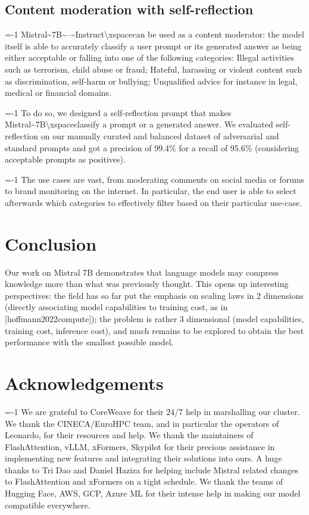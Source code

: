 \documentclass[11pt,a4paper]{article}
\begin{document}
\subsection{Content moderation with self-reflection}

=-1 Mistral\textasciitilde{}7B\textasciitilde{}--\textasciitilde{}Instruct\textbackslash{}xspacecan be used as a content moderator: the model itself is able to accurately classify a user prompt or its generated answer as being either acceptable or falling into one of the following categories: Illegal activities such as terrorism, child abuse or fraud; Hateful, harassing or violent content such as discrimination, self-harm or bullying; Unqualified advice for instance in legal, medical or financial domains.

=-1 To do so, we designed a self-reflection prompt that makes Mistral\textasciitilde{}7B\textbackslash{}xspaceclassify a prompt or a generated answer. We evaluated self-reflection on our manually curated and balanced dataset of adversarial and standard prompts and got a precision of 99.4\% for a recall of 95.6\% (considering acceptable prompts as positives).

=-1 The use cases are vast, from moderating comments on social media or forums to brand monitoring on the internet. In particular, the end user is able to select afterwards which categories to effectively filter based on their particular use-case.

\section{Conclusion}

Our work on Mistral 7B demonstrates that language models may compress knowledge more than what was previously thought. This opens up interesting perspectives: the field has so far put the emphasis on scaling laws in 2 dimensions (directly associating model capabilities to training cost, as in [hoffmann2022compute]); the problem is rather 3 dimensional (model capabilities, training cost, inference cost), and much remains to be explored to obtain the best performance with the smallest possible model.

\section{Acknowledgements}

=-1 We are grateful to CoreWeave for their 24/7 help in marshalling our cluster. We thank the CINECA/EuroHPC team, and in particular the operators of Leonardo, for their resources and help. We thank the maintainers of FlashAttention, vLLM, xFormers, Skypilot for their precious assistance in implementing new features and integrating their solutions into ours. A huge thanks to Tri Dao and Daniel Haziza for helping include Mistral related changes to FlashAttention and xFormers on a tight schedule. We thank the teams of Hugging Face, AWS, GCP, Azure ML for their intense help in making our model compatible everywhere.
\end{document}
